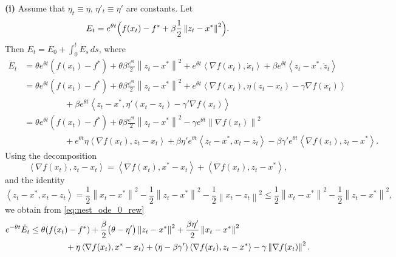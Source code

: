 \documentclass{article}
\newcommand{\norm}[1]{\left\lVert#1\right\rVert}
\newcommand{\dotprod}[1]{\left< #1\right>}
\theoremstyle{plain}
\theoremstyle{definition}
\theoremstyle{remark}
\begin{document}
\textbf{(i) \:}
Assume that $\eta_t\equiv\eta$, $\eta'_t\equiv\eta'$ are constants.
Let
\begin{equation}\label{eq:E_pl_accel}
    E_t = e^{\theta t}\Bigl(f(x_t)-f^\ast +\beta \frac{1}{2}\norm{z_t -  x^\ast}^2\Bigr).
\end{equation}
Then $E_t = E_0 + \int_0^t \dot{E}_s\,ds$, where
\begin{align}
    \dot{E}_t
    &= \theta  e^{\theta t}(f(x_t)-f^\ast)  +\theta \beta \frac{ e^{\theta t}}{2}\norm{z_t -  x^\ast}^2
    + e^{\theta t}\dotprod{\nabla f(x_t),\dot{x}_t} + \beta  e^{\theta t}\dotprod{z_t -  x^\ast,\dot{z}_t}
   \nonumber \\
    &= \theta  e^{\theta t}(f(x_t)-f^\ast)  +\theta \beta \frac{ e^{\theta t}}{2}\norm{z_t -  x^\ast}^2
    + e^{\theta t}\dotprod{\nabla f(x_t), \eta(z_t-x_t) - \gamma \nabla f(x_t)}\nonumber\\
    &\hspace{2cm}+ \beta   e^{\theta t}\dotprod{z_t - x^\ast,\eta'(x_t-z_t) - \gamma' \nabla f(x_t) } \nonumber\\
    &= \theta  e^{\theta t}(f(x_t)-f^\ast)  +\theta \beta \frac{ e^{\theta t}}{2}\norm{z_t -  x^\ast}^2
    - \gamma e^{\theta t}\norm{\nabla f(x_t)}^2 \nonumber\\
    &\hspace{2cm}+ e^{\theta t}\eta \dotprod{\nabla f(x_t), z_t-x_t}
    + \beta\eta' e^{\theta t}\dotprod{z_t - x^\ast,x_t - z_t}
    - \beta\gamma' e^{\theta t}\dotprod{\nabla f(x_t),z_t-x^\ast}.\label{eq:nest_ode_0_rew}
\end{align}
Using the decomposition
\[
\dotprod{\nabla f(x_t), z_t-x_t}
=
\dotprod{\nabla f(x_t), x^\ast-x_t}+\dotprod{\nabla f(x_t), z_t-x^\ast},
\]
and the identity
\[
\dotprod{z_t-x^\ast,x_t - z_t}
= \frac{1}{2}\norm{x_t-x^\ast}^2 -\frac{1}{2}\norm{z_t-x^\ast}^2-\frac{1}{2}\norm{x_t-z_t}^2
\le \frac{1}{2}\norm{x_t-x^\ast}^2 -\frac{1}{2}\norm{z_t-x^\ast}^2,
\]
we obtain from \eqref{eq:nest_ode_0_rew}
\begin{align}
    e^{-\theta t}\dot{E}_t
    &\le \theta(f(x_t)-f^\ast)
    + \frac{\beta}{2}\bigl(\theta-\eta'\bigr)\norm{z_t-x^\ast}^2
    + \frac{\beta\eta'}{2}\norm{x_t-x^\ast}^2 \nonumber\\
    &\hspace{1.5cm}+ \eta \dotprod{\nabla f(x_t), x^\ast-x_t}
    + (\eta-\beta\gamma')\dotprod{\nabla f(x_t), z_t-x^\ast}
    - \gamma \norm{\nabla f(x_t)}^2.\label{eq:pl_corr_nest_1_alt}
\end{align}
\end{document}
